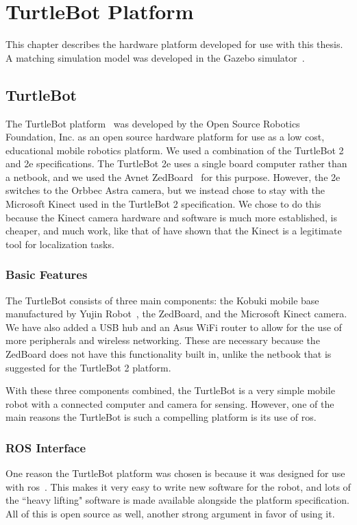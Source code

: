 \documentclass[thesis.tex]{subfile}
\begin{document}
\chapter{TurtleBot Platform} \label{ch:Hardware Platform}
This chapter describes the hardware platform developed for use with this thesis. A matching simulation model was developed in the Gazebo simulator~\cite{Koenig}.

\section{TurtleBot}
The TurtleBot platform~\cite{TurtleBot} was developed by the Open Source Robotics Foundation, Inc. as an open source hardware platform for use as a low cost, educational mobile robotics platform. We used a combination of the TurtleBot 2 and 2e specifications. The TurtleBot 2e uses a single board computer rather than a netbook, and we used the Avnet ZedBoard~\cite{ZedBoard} for this purpose. However, the 2e switches to the Orbbec Astra camera, but we instead chose to stay with the Microsoft Kinect used in the TurtleBot 2 specification. We chose to do this because the Kinect camera hardware and software is much more established, is cheaper, and much work, like that of \textcite{ganganath2012mobile, biswas2012depth, cunha2011using} have shown that the Kinect is a legitimate tool for localization tasks.

\subsection{Basic Features}
The TurtleBot consists of three main components: the Kobuki mobile base manufactured by Yujin Robot~\cite{Kobuki}, the ZedBoard, and the Microsoft Kinect camera. We have also added a USB hub and an Asus WiFi router to allow for the use of more peripherals and wireless networking. These are necessary because the ZedBoard does not have this functionality built in, unlike the netbook that is suggested for the TurtleBot 2 platform.

With these three components combined, the TurtleBot is a very simple mobile robot with a connected computer and camera for sensing. However, one of the main reasons the TurtleBot is such a compelling platform is its use of \gls{ros}.

\subsection{ROS Interface}
One reason the TurtleBot platform was chosen is because it was designed for use with \gls{ros}~\cite{TurtleBotWiki}. This makes it very easy to write new software for the robot, and lots of the ``heavy lifting" software is made available alongside the platform specification. All of this is open source as well, another strong argument in favor of using it.
\end{document}
